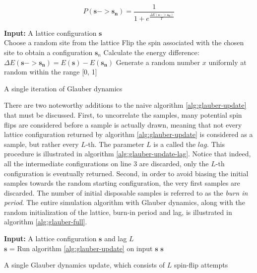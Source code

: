 \documentclass[12pt]{article}
\begin{document}
\begin{equation}
P(\boldsymbol{s} -> \boldsymbol{s_n}) = \frac{1}{1 + e^\frac{\Delta E(\boldsymbol{s} -> \boldsymbol{s_n})}{T}}
\label{eq:glauber-accept-prob}
\end{equation}

\begin{algorithm}
\textbf{Input:} A lattice configuration $\boldsymbol{s}$ \\
Choose a random site from the lattice\;
Flip the spin associated with the chosen site to obtain a configuration $\boldsymbol{s}_n$\;
Calculate the energy difference: $\Delta E(\boldsymbol{s} -> \boldsymbol{s_n}) = E(\boldsymbol{s}) - E(\boldsymbol{s_n})$\;
Generate a random number $x$ uniformly at random within the range [0, 1]\;
\caption{A single iteration of Glauber dynamics}
\label{alg:glauber-update}
\end{algorithm}

There are two noteworthy additions to the naive algorithm \ref{alg:glauber-update} that must be discussed. First, to uncorrelate the samples, many potential spin flips are considered before a sample is actually drawn, meaning that not every lattice configuration returned by algorithm \ref{alg:glauber-update} is considered as a sample, but rather every $L$-th. The parameter $L$ is a called the $lag$. This procedure is illustrated in algorithm \ref{alg:glauber-update-lag}. Notice that indeed, all the intermediate configurations on line $3$ are discarded,  only the $L$-th configuration is eventually returned. Second, in order to avoid biasing the initial samples towards the random starting configuration, the very first samples are discarded. The number of initial disposable samples is referred to as the \textit{burn in period}. The entire simulation algorithm with Glauber dynamics, along with the random initialization of the lattice, burn-in period and lag, is illustrated in algorithm \ref{alg:glauber-full}.

\begin{algorithm}
\textbf{Input:} A lattice configuration $\boldsymbol{s}$ and lag $L$ \\
 {
	$\boldsymbol{s}$ = Run algorithm \ref{alg:glauber-update} on input $\boldsymbol{s}$\;
}
\Return $\boldsymbol{s}$\;
\caption{A single Glauber dynamics update, which consists of $L$ spin-flip attempts}
\label{alg:glauber-update-lag}
\end{algorithm}
\end{document}
